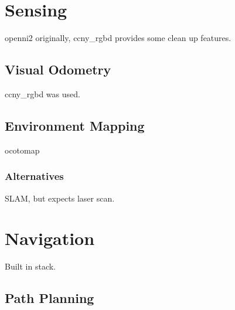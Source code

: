
\section{Sensing}

openni2 originally, ccny\_rgbd \cite{ccny_rgbd} provides some clean up features.

\subsection{Visual Odometry}

ccny\_rgbd \cite{ccny_rgbd} was used.

\subsection{Environment Mapping}

ocotomap

\subsubsection{Alternatives}

SLAM, but expects laser scan.


\section{Navigation}

Built in stack.

\subsection{Path Planning}